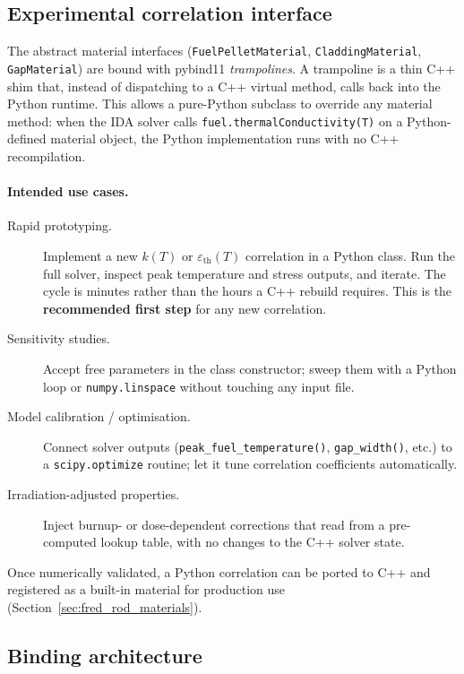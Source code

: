 \documentclass[11pt,a4paper]{article}
\begin{document}
\subsection{Experimental correlation interface}

The abstract material interfaces (\texttt{FuelPelletMaterial}, \texttt{CladdingMaterial}, \texttt{GapMaterial}) are bound with pybind11 \emph{trampolines}.  A trampoline is a thin C++ shim that, instead of dispatching to a C++ virtual method, calls back into the Python runtime.  This allows a pure-Python subclass to override any material method: when the IDA solver calls \texttt{fuel.thermalConductivity(T)} on a Python-defined material object, the Python implementation runs with no C++ recompilation.

\paragraph{Intended use cases.}
\begin{description}
  \item[Rapid prototyping.]  Implement a new $k(T)$ or $\varepsilon_\mathrm{th}(T)$ correlation in a Python class.  Run the full solver, inspect peak temperature and stress outputs, and iterate.  The cycle is minutes rather than the hours a C++ rebuild requires.  This is the \textbf{recommended first step} for any new correlation.
  \item[Sensitivity studies.]  Accept free parameters in the class constructor; sweep them with a Python loop or \texttt{numpy.linspace} without touching any input file.
  \item[Model calibration / optimisation.]  Connect solver outputs (\texttt{peak\_fuel\_temperature()}, \texttt{gap\_width()}, etc.) to a \texttt{scipy.optimize} routine; let it tune correlation coefficients automatically.
  \item[Irradiation-adjusted properties.]  Inject burnup- or dose-dependent corrections that read from a pre-computed lookup table, with no changes to the C++ solver state.
\end{description}

Once numerically validated, a Python correlation can be ported to C++ and registered as a built-in material for production use (Section~\ref{sec:fred_rod_materials}).

\subsection{Binding architecture}
\end{document}
